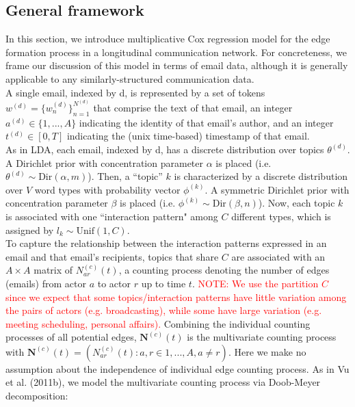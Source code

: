 \documentclass[a4paper]{article}
\begin{document}
\subsection{General framework}
In this section, we introduce multiplicative Cox regression model for the edge formation process in a longitudinal communication network. For concreteness, we frame our discussion of this model in terms of email data, although it is generally applicable to any similarly-structured communication data.\\ \newline A single email, indexed by d, is represented by a set of tokens $w^{(d)} = \{w^{(d)}_n \}_{n=1}^{N^{(d)}}$ that comprise the
text of that email, an integer $a^{(d)} \in \{1,...,A\}$ indicating the identity of that email’s author, and an integer $t^{(d)} \in [0, T]$ indicating the (unix time-based) timestamp of that email. \\ \newline
As in LDA, each email, indexed by d, has a discrete distribution over topics $\theta^{(d)}$. A Dirichlet prior
with concentration parameter $\alpha$ is placed (i.e. $\theta^{(d)}\sim \mbox{Dir}(\alpha, m)$). Then, a “topic” $k$ is characterized by a discrete distribution over $V$ word types with probability vector $\phi^{(k)}$. A symmetric Dirichlet prior with concentration parameter $\beta$ is placed (i.e. $\phi^{(k)} \sim \mbox{Dir}(\beta, n)$). Now, each topic $k$ is associated with one ``interaction pattern" among $C$ different types, which is assigned by $l_k \sim \mbox{Unif}(1, C)$. \\ \newline
To capture the relationship between the interaction patterns expressed in an email and that email’s recipients, topics that share $C$ are associated with an $A\times A$ matrix of $N^{(c)}_{ar}(t)$, a counting process denoting the number of edges (emails) from actor $a$ to actor $r$ up to time $t$. \textcolor{red}{NOTE: We use the partition $C$ since we expect that some topics/interaction patterns have little variation among the pairs of actors (e.g. broadcasting), while some have large variation (e.g. meeting scheduling, personal affairs).} Combining the individual counting processes of all potential edges,  $\mathbf{N}^{(c)}(t)$ is the multivariate counting process with $\mathbf{N}^{(c)}(t)=(N^{(c)}_{ar}(t): a, r \in {1, ..., A}, a \neq r)$. Here we make no assumption about the independence of individual edge counting process. As in Vu et al. (2011b), we model the multivariate counting process via Doob-Meyer decomposition:
\end{document}
